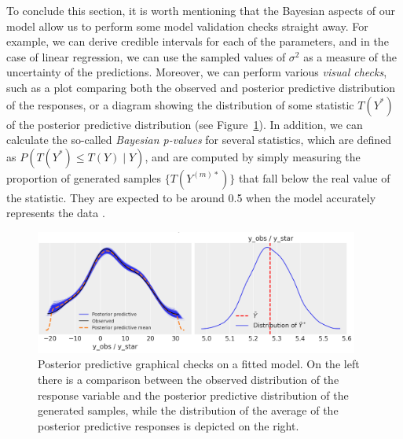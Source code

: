 \documentclass[ba]{imsart}
\numberwithin{equation}{section}
\theoremstyle{plain}
\begin{document}
To conclude this section, it is worth mentioning that the Bayesian aspects of our model allow us to perform some model validation checks straight away. For example, we can derive credible intervals for each of the parameters, and in the case of linear regression, we can use the sampled values of \(\sigma^2\) as a measure of the uncertainty of the predictions. Moreover, we can perform various \textit{visual checks}, such as a plot comparing both the observed and posterior predictive distribution of the responses, or a diagram showing the distribution of some statistic \(T(Y^*)\) of the posterior predictive distribution (see Figure~\ref{fig:ppc}). In addition, we can calculate the so-called \textit{Bayesian p-values} for several statistics, which are defined as \(P(T(Y^*)\leq T(Y)\mid Y)\), and are computed by simply measuring the proportion of generated samples \(\{T(Y^{(m)*})\}\) that fall below the real value of the statistic. They are expected to be around 0.5 when the model accurately represents the data \citep[see][Ch.~6]{gelman1995bayesian}.

\begin{figure}[h]
  \centering
  \includegraphics[width=0.95\textwidth]{img/ppc_lin}
  \caption{Posterior predictive graphical checks on a fitted model. On the left there is a comparison between the observed distribution of the response variable and the posterior predictive distribution of the generated samples, while the distribution of the average of the posterior predictive responses is depicted on the right.}\label{fig:ppc}
\end{figure}
\end{document}
